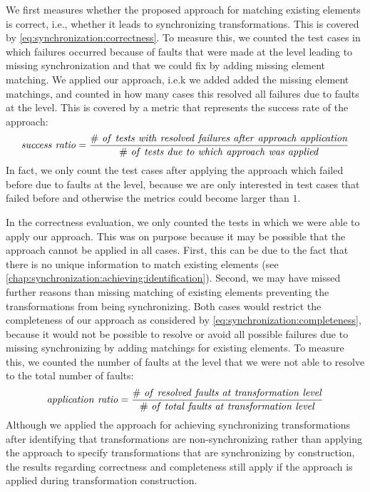 We first measures whether the proposed approach for matching existing elements is correct, i.e., whether it leads to synchronizing transformations. This is covered by \autoref{eq:synchronization:correctness}.
To measure this, we counted the test cases in which failures occurred because of faults that were made at the \leveltransformation level leading to missing synchronization and that we could fix by adding missing element matching.
We applied our approach, i.e.k we added added the missing element matchings, and counted in how many cases this resolved all failures due to faults at the \leveltransformation level.
This is covered by a metric that represents the success rate of the approach:
\begin{align*}
    \mathvariable{success\ ratio} = \frac{\mathvariable{\#\ of\ tests\ with\ resolved\ failures\ after\ approach\ application}}{\mathvariable{\#\ of\ tests\ due\ to\ which\ approach\ was\ applied}}
\end{align*}
In fact, we only count the test cases after applying the approach which failed before due to faults at the \leveltransformation level, because we are only interested in test cases that failed before and otherwise the metrics could become larger than $1$.

In the correctness evaluation, we only counted the tests in which we were able to apply our approach.
This was on purpose because it may be possible that the approach cannot be applied in all cases.
First, this can be due to the fact that there is no unique information to match existing elements (see \autoref{chap:synchronization:achieving:identification}).
Second, we may have missed further reasons than missing matching of existing elements preventing the transformations from being synchronizing.
Both cases would restrict the completeness of our approach as considered by \autoref{eq:synchronization:completeness}, because it would not be possible to resolve or avoid all possible failures due to missing synchronizing by adding matchings for existing elements.
To measure this, we counted the number of faults at the \leveltransformation level that we were not able to resolve to the total number of faults:
\begin{align*}
    \mathvariable{application\ ratio} = \frac{\mathvariable{\#\ of\ resolved\ faults\ at\ \leveltransformation\ level}}{\mathvariable{\#\ of\ total\ faults\ at\ \leveltransformation\ level}}
\end{align*}
Although we applied the approach for achieving synchronizing transformations after identifying that transformations are non-synchronizing rather than applying the approach to specify transformations that are synchronizing by construction, the results regarding correctness and completeness still apply if the approach is applied during transformation construction.


